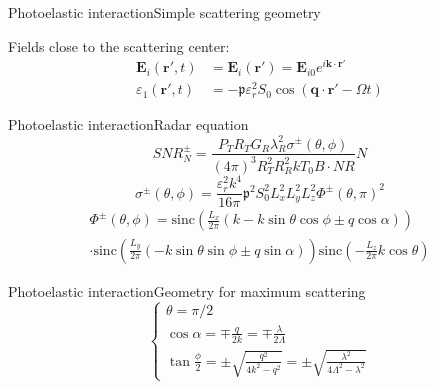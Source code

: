 \documentclass[11pt]{beamer}
\begin{document}
\begin{frame}{Photoelastic interaction}{Simple scattering geometry}
{
		}
		
		Fields close to the scattering center:
		\begin{align*}
			\bm{E}_i (\bm{r}',t) &= \bm{E}_i (\bm{r}') = \bm{E}_{i0} e^{i\bm{k}\cdot\bm{r}'} \\
			\varepsilon_1 (\bm{r}',t) &= -\mathfrak{p} \varepsilon_r^2 S_0 \cos(\bm{q} \cdot \bm{r}' - \Omega t)
		\end{align*}
	\end{frame}
	
	\begin{frame}{Photoelastic interaction}{Radar equation}
		\begin{equation*}
			\textit{SNR}^\pm_N = \frac{P_T R_T G_R \lambda_R^2 \sigma^\pm (\theta,\phi)}{(4\pi)^3 R_T^2 R_R^2 kT_0 B \cdot \mathit{NR}} N
		\end{equation*}
		\small
		\begin{equation*}
			\sigma^\pm (\theta, \phi) = \frac{\varepsilon_r^2 k^4}{16\pi} \mathfrak{p}^2 S_0^2 L_x^2 L_y^2 L_z^2 \Phi^\pm (\theta,\pi)^2
		\end{equation*}
		\begin{multline*}
			\Phi^\pm(\theta,\phi) = \text{sinc} \left( \frac{L_x}{2\pi} \left( k - k\sin{\theta}\cos{\phi} \pm q\cos{\alpha} \right) \right) \\
			\cdot \text{sinc} \left( \frac{L_y}{2\pi} \left( -k\sin{\theta}\sin{\phi} \pm q\sin{\alpha} \right) \right) 
			\text{sinc} \left( -\frac{L_z}{2\pi} k\cos{\theta} \right)
		\end{multline*}
	\end{frame}
	
	\begin{frame}{Photoelastic interaction}{Geometry for maximum scattering}
		\begin{equation*}
			\begin{cases}
				\theta = \pi/2 \\
				\cos{\alpha} = \mp \frac{q}{2k} = \mp \frac{\lambda}{2\Lambda} \\
				\tan{\frac{\phi}{2}} = \pm \sqrt{\frac{q^2}{4k^2-q^2}} = \pm \sqrt{\frac{\lambda^2}{4\Lambda^2-\lambda^2}}
			\end{cases}
		\end{equation*}
	\end{frame}
	
\end{document}
